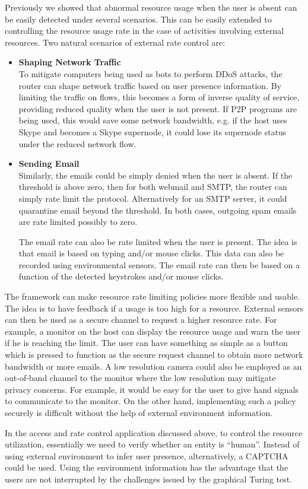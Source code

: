 Previously we showed that abnormal resource usage when the user
is absent can be easily detected under several scenarios.
This can be easily extended to controlling the resource usage
rate in the case of activities involving external resources.
Two natural scenarios of external rate control are:
\begin{itemize}
\item {\bf Shaping Network Traffic} \\
To mitigate computers being used as bots to perform DDoS attacks,
the router can shape network traffic based on user presence information.
By limiting the traffic on flows, this becomes a form
of inverse quality of service, providing reduced quality when the user
is not present. If P2P programs are being used, this would
save some network bandwidth, e.g. if the host uses Skype and becomes
a Skype supernode, it could lose its supernode status under
the reduced network flow.


\item {\bf Sending Email} \\
Similarly, the emails could be simply denied when the user is absent.
If the threshold is above zero, then
for both webmail and SMTP, the router can simply
rate limit the protocol. Alternatively for an SMTP server, it could
quarantine email beyond the threshold. In both cases, outgoing spam emails
are rate limited possibly to zero.

The email rate can also be rate limited when the user is present.
The idea is that email is based on typing and/or mouse clicks.
This data can also be recorded using environmental sensors.
The email rate can then be based on a function of the detected
keystrokes and/or mouse clicks.
\end{itemize}

The framework can make resource rate limiting policies more flexible and usable.
The idea is to have feedback if a usage is too high for a resource.
External sensors can then be used as a secure channel to request a higher
resource rate.
For example, a monitor on the host can display the resource usage and
warn the user if he is reaching the limit.
The user can have something as simple as a button which is pressed
to function as the secure request
channel to obtain more network bandwidth or more emails.
A low resolution camera could also be employed as an out-of-band channel
to the monitor where the low resolution may mitigate privacy concerns.
For example, it would be easy for the user to give hand signals to
communicate to the monitor.
On the other hand, implementing
such a policy securely is difficult 
without the help of external environment information.

In the access and rate control application discussed above,
to control the resource utilization,
essentially we need to verify whether an entity is ``human''.
Instead of using external environment to infer user presence,
alternatively, a CAPTCHA could be used.
Using the environment information
has the advantage that the users are not interrupted by the
challenges issued by the graphical Turing test.

